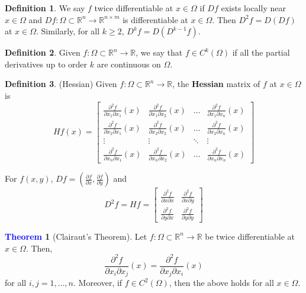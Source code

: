 \documentclass[11pt]{article}
\theoremstyle{definition}
\theoremstyle{definition}
\newcommand{\R}[0]{\mathbb{R}}
\newcommand{\pdv}[2]{\frac{\partial #1}{\partial #2}}
\newtheorem{theorem}{\textcolor{blue}{Theorem}}
\theoremstyle{definition}
\newtheorem{definition}{\textcolor{OliveGreen}{Definition}}
\theoremstyle{remark}
\begin{document}
\begin{definition}
We say $f$ twice differentiable at $x \in \Omega$ if $Df$ exists locally near $x \in \Omega$ and
$Df : \Omega \subset \R^n \to \R^{n \times m}$ is differentiable at $x \in \Omega$. Then
$D^2f = D(Df)$ at $x \in \Omega$. Similarly, for all $k \geq 2$, $D^kf = D(D^{k - 1}f)$.          
\end{definition}

\begin{definition}
    Given $f : \Omega \subset \R^n \to \R$, we say that $f \in C^k(\Omega)$ if all the partial
    derivatives up to order $k$ are continuous on $\Omega$.    
\end{definition}

\begin{definition}(Hessian)
    Given $f : \Omega \subset \R^n \to \R$, the \textbf{Hessian} matrix of $f$ at $x \in \Omega$ is
    \[
        Hf(x) = \begin{bmatrix}
            \pdv{^2f}{x_1 \partial x_1} (x) & \pdv{^2f}{x_1 \partial x_2} (x) & \dots & \pdv{^2f}{x_1 \partial x_n} (x) \\
            \pdv{^2f}{x_2 \partial x_1} (x) & \pdv{^2f}{x_2 \partial x_2} (x) & \dots & \pdv{^2f}{x_2 \partial x_n} (x) \\
            \vdots & \vdots & \ddots & \vdots \\
            \pdv{^2f}{x_n \partial x_1} (x) & \pdv{^2f}{x_n \partial x_2} (x) & \dots & \pdv{^2f}{x_n \partial x_n} (x)
        \end{bmatrix}
    \]    

    For $f(x, y)$, $Df = (\pdv{f}{x}, \pdv{f}{y})$ and 
    \[
        D^2f = Hf = \begin{bmatrix}
            \pdv{^2f}{x \partial x} & \pdv{^2f}{x \partial y} \\
            \pdv{^2f}{y \partial x} & \pdv{^2f}{y \partial y}
        \end{bmatrix}
    \]    
\end{definition}

\begin{theorem}[Clairaut's Theorem]
    Let $f : \Omega \subset \R^n \to \R$ be twice differentiable at $x \in \Omega$. Then,
    \[
        \pdv{^2f}{x_i \partial x_j} (x) = \pdv{^2f}{x_j \partial x_i} (x)
    \]   
    for all $i, j = 1, \dots, n$. Moreover, if $f \in C^2(\Omega)$, then the above holds for all
    $x \in \Omega$. 
\end{theorem}
\end{document}
